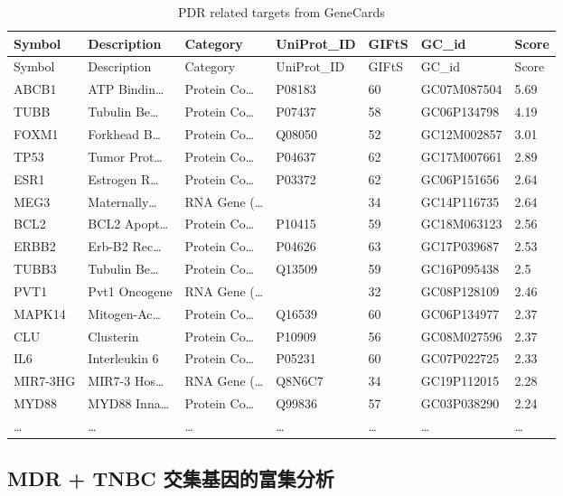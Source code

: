 \documentclass[
]{article}
\begin{document}
\begin{longtable}[]{@{}lllllll@{}}
\caption{\label{tab:PDR-related-targets-from-GeneCards}PDR related targets from GeneCards}\tabularnewline
\toprule
Symbol & Description & Category & UniProt\_ID & GIFtS & GC\_id & Score\tabularnewline
\midrule
\endfirsthead
\toprule
Symbol & Description & Category & UniProt\_ID & GIFtS & GC\_id & Score\tabularnewline
\midrule
\endhead
ABCB1 & ATP Bindin\ldots{} & Protein Co\ldots{} & P08183 & 60 & GC07M087504 & 5.69\tabularnewline
TUBB & Tubulin Be\ldots{} & Protein Co\ldots{} & P07437 & 58 & GC06P134798 & 4.19\tabularnewline
FOXM1 & Forkhead B\ldots{} & Protein Co\ldots{} & Q08050 & 52 & GC12M002857 & 3.01\tabularnewline
TP53 & Tumor Prot\ldots{} & Protein Co\ldots{} & P04637 & 62 & GC17M007661 & 2.89\tabularnewline
ESR1 & Estrogen R\ldots{} & Protein Co\ldots{} & P03372 & 62 & GC06P151656 & 2.64\tabularnewline
MEG3 & Maternally\ldots{} & RNA Gene (\ldots{} & & 34 & GC14P116735 & 2.64\tabularnewline
BCL2 & BCL2 Apopt\ldots{} & Protein Co\ldots{} & P10415 & 59 & GC18M063123 & 2.56\tabularnewline
ERBB2 & Erb-B2 Rec\ldots{} & Protein Co\ldots{} & P04626 & 63 & GC17P039687 & 2.53\tabularnewline
TUBB3 & Tubulin Be\ldots{} & Protein Co\ldots{} & Q13509 & 59 & GC16P095438 & 2.5\tabularnewline
PVT1 & Pvt1 Oncogene & RNA Gene (\ldots{} & & 32 & GC08P128109 & 2.46\tabularnewline
MAPK14 & Mitogen-Ac\ldots{} & Protein Co\ldots{} & Q16539 & 60 & GC06P134977 & 2.37\tabularnewline
CLU & Clusterin & Protein Co\ldots{} & P10909 & 56 & GC08M027596 & 2.37\tabularnewline
IL6 & Interleukin 6 & Protein Co\ldots{} & P05231 & 60 & GC07P022725 & 2.33\tabularnewline
MIR7-3HG & MIR7-3 Hos\ldots{} & RNA Gene (\ldots{} & Q8N6C7 & 34 & GC19P112015 & 2.28\tabularnewline
MYD88 & MYD88 Inna\ldots{} & Protein Co\ldots{} & Q99836 & 57 & GC03P038290 & 2.24\tabularnewline
\ldots{} & \ldots{} & \ldots{} & \ldots{} & \ldots{} & \ldots{} & \ldots{}\tabularnewline
\bottomrule
\end{longtable}

\begin{center}\vspace{1.5cm}\end{center}

\hypertarget{mdr-tnbc-ux4ea4ux96c6ux57faux56e0ux7684ux5bccux96c6ux5206ux6790}{%
\subsection{MDR + TNBC 交集基因的富集分析}\label{mdr-tnbc-ux4ea4ux96c6ux57faux56e0ux7684ux5bccux96c6ux5206ux6790}}
\end{document}
